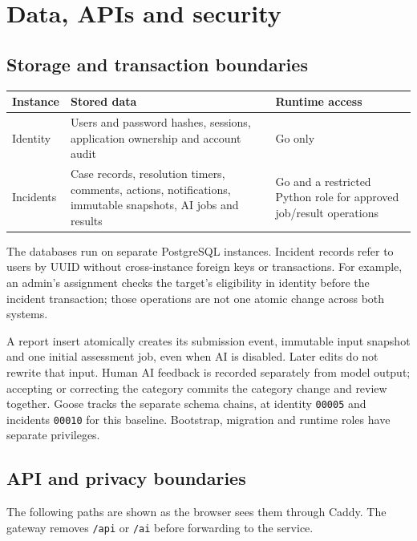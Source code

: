 \documentclass[11pt,a4paper]{article}
\newcommand{\code}[1]{\texttt{#1}}
\newcommand{\route}[1]{\nolinkurl{#1}}
\begin{document}
\section{Data, APIs and security}

\subsection{Storage and transaction boundaries}

\begin{center}
\begin{tabularx}{\linewidth}{@{}lYY@{}}
\toprule
\textbf{Instance} & \textbf{Stored data} & \textbf{Runtime access} \\
\midrule
Identity & Users and password hashes, sessions, application ownership and
account audit & Go only \\
\addlinespace
Incidents & Case records, resolution timers, comments, actions,
notifications, immutable snapshots, AI jobs and results & Go and a
restricted Python role for approved job/result operations \\
\bottomrule
\end{tabularx}
\end{center}

The databases run on separate PostgreSQL instances. Incident records refer
to users by UUID without cross-instance foreign keys or transactions. For
example, an admin's assignment checks the target's eligibility in identity
before the incident transaction; those operations are not one atomic change
across both systems.

A report insert atomically creates its submission event, immutable input
snapshot and one initial assessment job, even when AI is disabled.
Later edits do not rewrite that input. Human AI feedback is recorded
separately from model output; accepting or correcting the category commits
the category change and review together. Goose tracks the separate schema
chains, at identity \code{00005} and incidents \code{00010} for this
baseline. Bootstrap, migration and runtime roles have separate privileges.

\subsection{API and privacy boundaries}

The following paths are shown as the browser sees them through Caddy. The
gateway removes \route{/api} or \route{/ai} before forwarding to the service.
\end{document}
